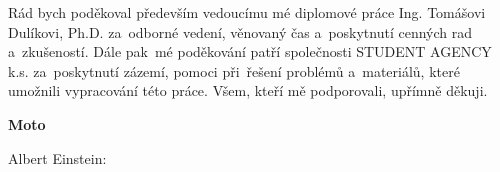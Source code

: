\documentclass[a4paper,12pt]{article}
\begin{document}
\titulnistrana

\zadani

\prohlaseni

\abstraktaklicovaslova


\clearpage
\thispagestyle{empty}
Rád bych poděkoval především vedoucímu mé diplomové práce Ing. Tomášovi Dulíkovi, Ph.D. za~odborné vedení, věnovaný čas a~poskytnutí cenných rad a~zkušeností. Dále pak~mé poděkování patří společnosti STUDENT AGENCY k.s. za~poskytnutí zázemí, pomoci při~řešení problémů a~materiálů,  které umožnili vypracování této práce. Všem, kteří mě podporovali, upřímně děkuji.  


\textbf{Moto}

Albert Einstein: 

\obsah  %


\OdsazovaniOdstavcuStart %


\OdsazovaniOdstavcuStop
\end{document}
